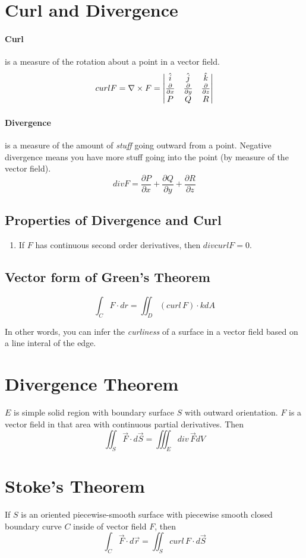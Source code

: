 \documentclass[a4paper,12pt]{report}
\begin{document}
\section{Curl and Divergence}
\paragraph{Curl } is a measure of the rotation about a point in a vector field.
$$curl F = \nabla \times F = 
\begin{vmatrix}
\hat{i} & \hat{j} & \hat{k} \\ 
\frac{\partial}{\partial x} & \frac{\partial}{\partial y} & \frac{\partial }{\partial z} \\
P & Q & R \notag
\end{vmatrix}
$$

\paragraph{Divergence } is a measure of the amount of \textit{stuff} going outward from a point. Negative divergence means you have more stuff 
going into the point (by measure of the vector field).  
$$div F = \frac{\partial P}{\partial x} + \frac{\partial Q}{\partial y} + \frac{\partial R}{\partial z}$$

\subsection{Properties of Divergence and Curl}
\begin{enumerate}
\item If $F$ has continuous second order derivatives, then $div curl F = 0$.
\end{enumerate}

\subsection{Vector form of Green's Theorem}
$$\int_C F \cdot dr = \iint_D (curl\,F)\cdot k dA$$

In other words, you can infer the \textit{curliness} of a surface in a vector field based on a line interal of the edge.

\section{Divergence Theorem}
$E$ is simple solid region with boundary surface $S$ with outward orientation. $F$ is a vector field in that area 
with continuous partial derivatives. Then
$$\iint_S \vec{F}\cdot d\vec{S} = \iiint_E div\,\vec{F} dV$$


\section{Stoke's Theorem}
If $S$ is an oriented piecewise-smooth surface with piecewise smooth closed boundary curve $C$ inside of 
vector field $F$, then 
$$\int_C \vec{F} \cdot d\vec{r} = \iint_S curl\,F\cdot d\vec{S}$$
\end{document}
